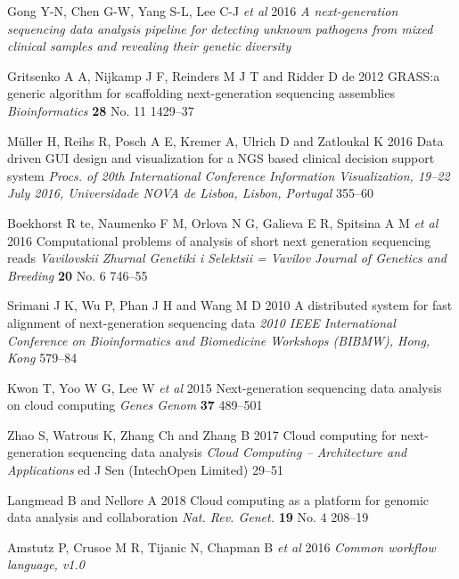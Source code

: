\documentclass[a4paper]{jpconf}
\renewcommand{\doi}[1]{} %
\begin{document}
\begin{thebibliography}{0}
 Gong Y-N, Chen G-W, Yang S-L, Lee C-J \emph{et al} 2016 \emph{A next-generation sequencing data analysis pipeline for detecting unknown pathogens from mixed clinical samples and revealing their genetic diversity} \doi{10.1371/journal.pone.0151495}

 Gritsenko A A, Nijkamp J F, Reinders M J T and Ridder D de 2012 GRASS:\@ a generic algorithm for scaffolding next-generation sequencing assemblies \emph{Bioinformatics} \textbf{28} No. 11  1429--37 \doi{10.1093/bioinformatics/bts175}

 Müller H, Reihs R, Posch A E, Kremer A, Ulrich D and Zatloukal K 2016 Data driven GUI design and visualization for a NGS based clinical decision support system \emph{Procs. of 20th International Conference Information Visualization, 19--22 July 2016, Universidade NOVA de Lisboa, Lisbon, Portugal} 355--60 \doi{10.1109/IV.2016.79}

 Boekhorst R te, Naumenko F M, Orlova N G, Galieva E R, Spitsina A M \emph{et al} 2016 Computational problems of analysis of short next generation sequencing reads \emph{Vavilovskii Zhurnal Genetiki i Selektsii = Vavilov Journal of Genetics and Breeding} \textbf{20} No. 6 746--55 \doi{10.18699/VJ16.191}

 Srimani J K, Wu P, Phan J H and Wang M D 2010 A distributed system for fast alignment of next-generation sequencing data \emph{2010 IEEE International Conference on Bioinformatics and Biomedicine Workshops (BIBMW), Hong, Kong} 579--84 \doi{10.1109/BIBMW.2010.5703865}

 Kwon T, Yoo W G, Lee W \emph{et al} 2015 Next-generation sequencing data analysis on cloud computing \emph{Genes Genom} \textbf{37} 489--501 \doi{10.1007/s13258-015-0280-7}

 Zhao S, Watrous K, Zhang Ch and Zhang B 2017 Cloud computing for next-generation sequencing data analysis \emph{Cloud Computing -- Architecture and Applications} ed J Sen (IntechOpen Limited) 29--51 \doi{10.5772/66732}

 Langmead B and Nellore A 2018 Cloud computing as a platform for genomic data analysis and collaboration \emph{Nat. Rev. Genet.} \textbf{19} No. 4 208--19 \doi{10.1038/nrg.2017.113}

 Amstutz P, Crusoe M R, Tijanic N, Chapman B \emph{et al} 2016 \emph{Common workflow language, v1.0} \doi{10.6084/m9.figshare.3115156.v2}


\end{thebibliography}
\end{document}
